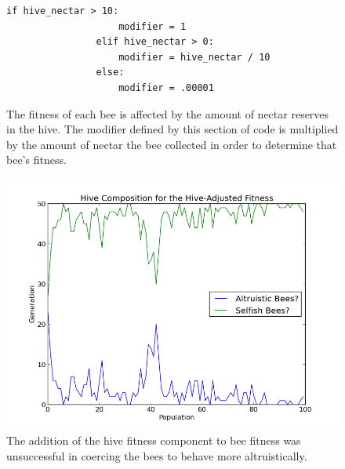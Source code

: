 \documentclass[11pt]{article}
\begin{document}
			\begin{figure}[tbh!]
				\begin{Verbatim}[frame=single]
                if hive_nectar > 10:
                    modifier = 1
                elif hive_nectar > 0:
                    modifier = hive_nectar / 10
                else:
                    modifier = .00001 
				\end{Verbatim}
				\caption{The fitness of each bee is affected by the amount of nectar reserves in the hive. The modifier defined by this section of code is multiplied by the amount of nectar the bee collected in order to determine that bee's fitness.}
				\label{fig:modifier_algorithm}
			\end{figure}

			\begin{figure}[tbph!]
				\begin{center}
					\includegraphics[scale=.5]{results/hive_fitness_comp.png}
				\end{center}
				\caption{The addition of the hive fitness component to bee fitness was unsuccessful in coercing the bees to behave more altruistically.}
				\label{fig:hive_fitness_composition}
			\end{figure}
\end{document}
